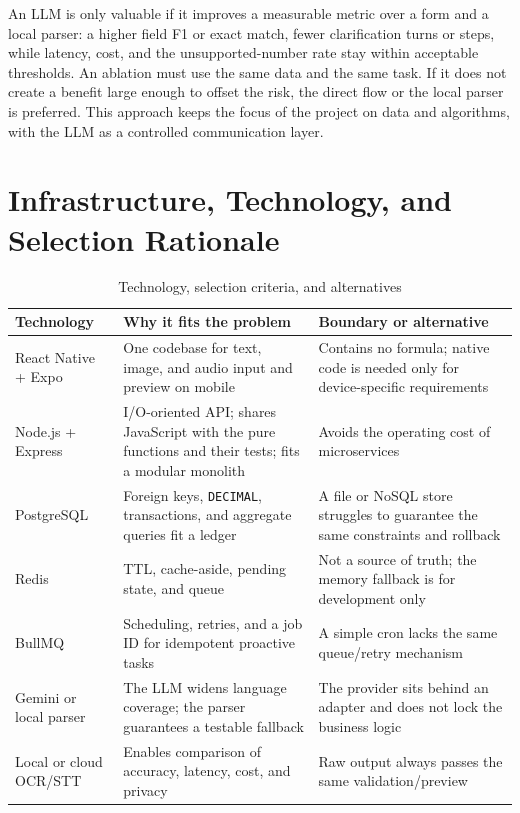 An LLM is only valuable if it improves a measurable metric over a form
and a local parser: a higher field F1 or exact match, fewer
clarification turns or steps, while latency, cost, and the
unsupported-number rate stay within acceptable thresholds. An ablation
must use the same data and the same task. If it does not create a
benefit large enough to offset the risk, the direct flow or the local
parser is preferred. This approach keeps the focus of the project on
data and algorithms, with the LLM as a controlled communication layer.

\section{Infrastructure, Technology, and Selection Rationale}

\begin{table}[htbp]
  \centering
  \caption{Technology, selection criteria, and alternatives}
  \label{tab:technology-rationale}
  \small
  \begin{tabularx}{\textwidth}{|p{3.2cm}|X|X|}
    \hline
    \textbf{Technology} & \textbf{Why it fits the problem} &
    \textbf{Boundary or alternative} \\ \hline
    React Native + Expo & One codebase for text, image, and audio input
    and preview on mobile & Contains no formula; native code is needed
    only for device-specific requirements \\ \hline
    Node.js + Express & I/O-oriented API; shares JavaScript with the pure
    functions and their tests; fits a modular monolith & Avoids the
    operating cost of microservices \\ \hline
    PostgreSQL & Foreign keys, \texttt{DECIMAL}, transactions, and
    aggregate queries fit a ledger & A file or NoSQL store struggles to
    guarantee the same constraints and rollback \\ \hline
    Redis & TTL, cache-aside, pending state, and queue & Not a source of
    truth; the memory fallback is for development only \\ \hline
    BullMQ & Scheduling, retries, and a job ID for idempotent proactive
    tasks & A simple cron lacks the same queue/retry mechanism \\ \hline
    Gemini or local parser & The LLM widens language coverage; the parser
    guarantees a testable fallback & The provider sits behind an adapter
    and does not lock the business logic \\ \hline
    Local or cloud OCR/STT & Enables comparison of accuracy, latency,
    cost, and privacy & Raw output always passes the same
    validation/preview \\ \hline
  \end{tabularx}
\end{table}

